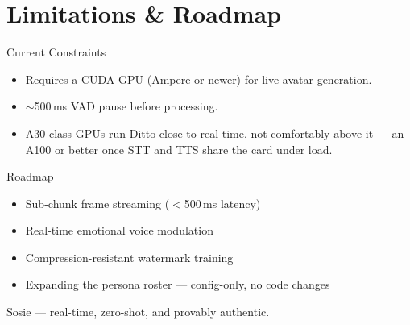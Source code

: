 \documentclass[11pt]{beamer}
\begin{document}
\section{Limitations \& Roadmap}

\begin{frame}{Current Constraints}
  \begin{itemize}
    \item Requires a CUDA GPU (Ampere or newer) for live avatar generation.
    \item $\sim$500\,ms VAD pause before processing.
    \item A30-class GPUs run Ditto close to real-time, not comfortably above it --- an A100 or better once STT and TTS share the card under load.
  \end{itemize}
\end{frame}

\begin{frame}{Roadmap}
  \begin{itemize}
    \item Sub-chunk frame streaming ($<$500\,ms latency)
    \item Real-time emotional voice modulation
    \item Compression-resistant watermark training
    \item Expanding the persona roster --- config-only, no code changes
  \end{itemize}
\end{frame}

\begin{frame}[standout]
  Sosie --- real-time, zero-shot, and provably authentic.
\end{frame}
\end{document}
